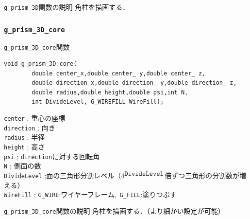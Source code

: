 \documentclass[a4paper,12pt]{jsarticle}%
\begin{document}
\begin{itembox}[l]{\texttt{g\_prism\_3D}関数の説明}
角柱を描画する．
\end{itembox}




\clearpage
\subsubsection{\texttt{g\_prism\_3D\_core}}

\begin{itembox}[l]{\texttt{g\_prism\_3D\_core}関数}
\begin{verbatim}
void g_prism_3D_core(
        double center_x,double center_ y,double center_ z,
        double direction_x,double direction_ y,double direction_ z,
        double radius,double height,double psi,int N,
        int DivideLevel, G_WIREFILL WireFill);
\end{verbatim}
\verb|center| ; 重心の座標\\
\verb|direction| ; 向き\\
\verb|radius| ; 半径\\
\verb|height| ; 高さ\\
\verb|psi| ; \verb|direction|に対する回転角\\
\verb|N| ; 側面の数\\
\verb|DivideLevel| ;面の三角形分割レベル（$4^{\verb|DivideLevel|}$倍ずつ三角形の分割数が増える）\\
\verb|WireFill| ; \verb|G_WIRE|:ワイヤーフレーム,\ \verb|G_FILL|:塗りつぶす \\
\end{itembox}

\begin{itembox}[l]{\texttt{g\_prism\_3D\_core}関数の説明}
角柱を描画する．（より細かい設定が可能）
\end{itembox}
\end{document}
